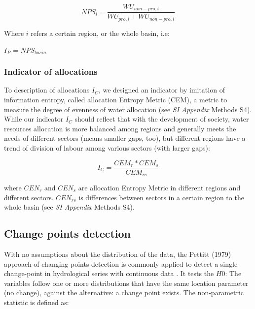 \documentclass[9pt, twocolumn, twoside, lineno]{pnas-new}
\begin{document}
{	$$ NPS_{i} = \frac{WU_{non-pro, i}}{WU_{pro, i} + WU_{non-pro, i}} $$

	Where $i$ refers a certain region, or the whole basin, i.e:

	$I_P$ = $NPS_{basin}$

	\subsubsection*{Indicator of allocations}
	To description of allocations $I_C$, we designed an indicator by imitation of information entropy, called allocation Entropy Metric (CEM), a metric to measure the degree of evenness of water allocation (see \textit{SI Appendix} Methods S4).
	While our indicator $I_C$ should reflect that with the development of society, water resources allocation is more balanced among regions and generally meets the needs of different sectors (means smaller gaps, too), but different regions have a trend of division of labour among various sectors (with larger gaps):

	$$ I_C = \frac{CEM_{r}*CEM_{s}}{CEM_{rs}}$$
	
	where $CEN_{r}$ and $CEN_{s}$ are allocation Entropy Metric in different regions and different sectors. $CEN_{rs}$ is differences between sectors in a certain region to the whole basin (see \textit{SI Appendix} Methods S4). 

	\subsection*{Change points detection}

		With no assumptions about the distribution of the data, the Pettitt (1979) approach of changing points detection is commonly applied to detect a single change-point in hydrological series with continuous data \cite{pettittNonParametricApproachChangePoint1979}. 
		It tests the $H0$: The variables follow one or more distributions that have the same location parameter (no change), against the alternative: a change point exists. The non-parametric statistic is defined as:
	
}
\end{document}
